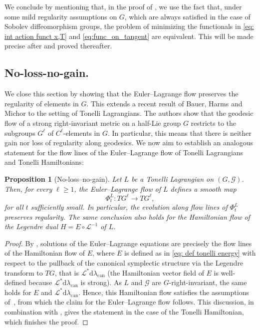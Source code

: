 \documentclass[11pt,reqno]{amsart}
\theoremstyle{plain}
\newtheorem{prop}[thm]{Proposition}
\theoremstyle{definition}
\theoremstyle{plain} %
\newtheorem{prop}[prop]{Proposition}
\theoremstyle{definition} %
\numberwithin{equation}{section}
\def\d{\delta}
\def\d{\delta}
\def\d{{\mathrm{d}}}
\begin{document}
We conclude by mentioning that, in the proof of , we use the fact that, under some mild regularity assumptions on \( G \), which are always satisfied in the case of Sobolev diffeomorphism groups, the problem of minimizing the functionals in \eqref{eq: int action funct x,T} and \eqref{eq:func_on_tangent} are equivalent. This will be made precise after  and proved thereafter.
\subsection{No-loss-no-gain.} 
We close this section by showing that the Euler--Lagrange flow preserves the regularity of elements in \( G \). This extends a recent result of Bauer, Harms and Michor to the setting of Tonelli Lagrangians. The authors show that the geodesic flow of a strong right-invariant metric on a half-Lie group \( G \) restricts to the subgroups \( G^\ell \) of \( C^\ell \)-elements in \( G \).
In particular, this means that there is neither gain nor loss of regularity along geodesics. 
We now aim to establish an analogous statement for the flow lines of the Euler--Lagrange flow of Tonelli Lagrangians and Tonelli Hamiltonians: 

\begin{prop}[No-loss–no-gain]\label{prop: no gain no loose}
Let $L$ be a Tonelli Lagrangian on \( (G, \mathcal{G}) \).
Then, for every \( \ell \geq 1 \), the Euler–Lagrange flow of $L$ defines a smooth map
\[
\Phi_t^{L} : TG^\ell \longrightarrow TG^\ell,
\]
for all \( t \) sufficiently small. 
In particular, the evolution along flow lines of $\Phi_t^{L}$ preserves regularity. 
The same conclusion also holds for the Hamiltonian flow of the Legendre dual \( H = E \circ \mathcal L^{-1} \) of $L$.
\end{prop}
\begin{proof}
By , solutions of the Euler–Lagrange equations are precisely the flow lines of the Hamiltonian flow of $E$, 
where $E$ is defined as in \eqref{eq: def tonelli energy} 
with respect to the pullback of the canonical symplectic structure via the Legendre transform to $TG$, 
that is \( \mathcal{L}^*\d\lambda_{\mathrm{can}} \) (the Hamiltonian vector field of \( E \) is well-defined because \( \mathcal L^* \d \lambda_{\mathrm{can}} \) is strong).
As \( L \) and \( \mathcal{G} \) are \( G \)-right-invariant, the same holds for \( E \) and \( \mathcal{L}^*\d\lambda_{\mathrm{can}} \). 
Hence, this Hamiltonian flow satisfies the assumptions of~\cite[Thm.~7.5]{Bauer_2025}, 
from which the claim for the Euler--Lagrange flow follows. 
This discussion, in combination with , 
gives the statement in the case of the Tonelli Hamiltonian, which finishes the proof.
\end{proof}
\end{document}
